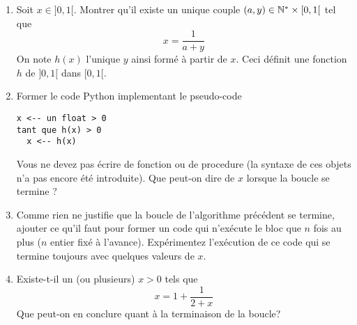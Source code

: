 \begin{enumerate}
 \item Soit $x\in ]0,1[$. Montrer qu'il existe un unique couple $(a,y)\in \mathbb{N}^* \times [0,1[$ tel que
 \begin{displaymath}
  x =  \frac{1}{a+y}
 \end{displaymath}
On note $h(x)$ l'unique $y$ ainsi formé à partir de $x$. Ceci définit une fonction $h$ de $]0,1[$ dans $[0,1[$.

\item Former le code Python implementant le pseudo-code
\begin{verbatim}
x <-- un float > 0
tant que h(x) > 0
  x <-- h(x)
\end{verbatim}
Vous ne devez pas écrire de fonction ou de procedure  (la syntaxe de ces objets n'a pas encore été introduite). Que peut-on dire de $x$ lorsque la boucle se termine ?
\item Comme rien ne justifie que la boucle de l'algorithme précédent se termine, ajouter ce qu'il faut pour former un code qui n'exécute le bloc que $n$ fois au plus ($n$ entier fixé à l'avance). Expérimentez l'exécution de ce code qui se termine toujours avec quelques valeurs de $x$.

\item Existe-t-il un (ou plusieurs) $x>0$ tels que
\begin{displaymath}
 x = 1 + \frac{1}{2+x}
\end{displaymath}
Que peut-on en conclure quant à la terminaison de la boucle?
\end{enumerate}
